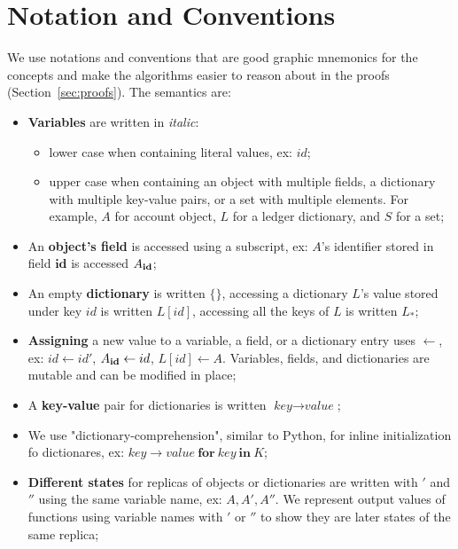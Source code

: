 \documentclass[9pt, oneside]{article}   	%
\begin{document}
\newpage




\newpage
\appendix

\section{Notation and Conventions}
\label{apdx:notation}

We use notations and conventions that are good graphic mnemonics for the concepts and make the algorithms easier to reason about in the proofs (Section~\ref{sec:proofs}). The semantics are:

\begin{itemize}
	\item \textbf{Variables} are written in \textit{italic}:
		\begin{itemize}
			\item  lower case when containing literal values, ex: $id$;
			\item upper case when containing an object with multiple fields, a dictionary with multiple key-value pairs, or a set with multiple elements. For example, $A$ for account object, $L$ for a ledger dictionary, and $S$ for a set;
		\end{itemize}
	\item An \textbf{object's field} is accessed using a subscript, ex: $A$'s identifier stored in field $\textbf{id}$ is accessed $A_{\scriptsize \textbf{id}}$;
	\item An empty \textbf{dictionary} is written $\{\}$, accessing a dictionary $L$'s value stored under key $id$ is written $L[id]$, accessing all the keys of $L$ is written $L_*$;
	\item \textbf{Assigning} a new value to a variable, a field, or a dictionary entry uses $\leftarrow$, ex: $id \leftarrow id'$, $A_{\scriptsize\textbf{id}} \leftarrow id$, $L[id] \leftarrow A$. Variables, fields, and dictionaries are mutable and can be modified in place;
	 \item A \textbf{key-value} pair for dictionaries is written $\textit{key} \rightarrow \textit{value}$;
	 \item We use "dictionary-comprehension", similar to Python, for inline initialization fo dictionares, ex: ${ \textit{key} \rightarrow \textit{value} ~\textbf{for}~ \textit{key} ~\textbf{in}~ K }$;
	\item \textbf{Different states} for replicas of objects or dictionaries are written with $'$ and $''$ using the same variable name, ex: $A, A', A''$. We represent output values of functions using variable names with $'$ or $''$ to show they are later states of the same replica;

\end{itemize}
\end{document}
